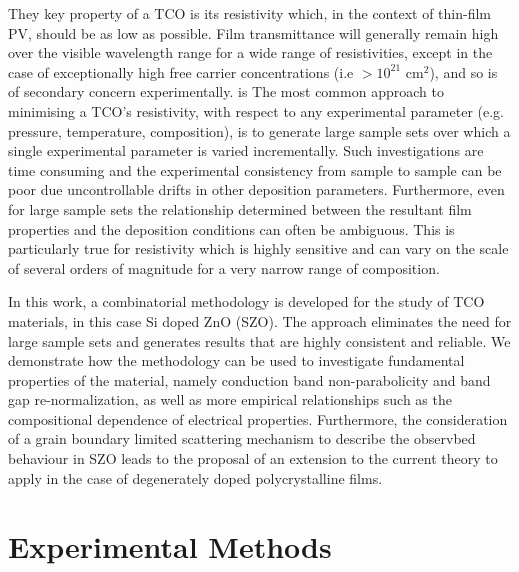 \documentclass[preprint]{elsarticle}
\begin{document}
They key property of a TCO is its resistivity which, in the context of thin-film PV, should be as low as possible. Film transmittance will generally remain high over the visible wavelength range for a wide range of resistivities, except in the case of exceptionally high free carrier concentrations (i.e $>10^{21}$ cm$^2$), and so is of secondary concern experimentally. is The most common approach to minimising a TCO's resistivity, with respect to any experimental parameter (e.g. pressure, temperature, composition), is to generate large sample sets over which a single experimental parameter is varied incrementally. Such investigations are time consuming and the experimental consistency from sample to sample can be poor due uncontrollable drifts in other deposition parameters. Furthermore, even for large sample sets the relationship determined between the resultant film properties and the deposition conditions can often be ambiguous. This is particularly true for resistivity which is highly sensitive and can vary on the scale of several orders of magnitude for a very narrow range of composition.

In this work, a combinatorial methodology is developed for the study of TCO materials, in this case Si doped ZnO (SZO). The approach eliminates the need for large sample sets and generates results that are highly consistent and reliable. We demonstrate how the methodology can be used to investigate fundamental properties of the material, namely conduction band non-parabolicity and band gap re-normalization, as well as more empirical relationships such as the compositional dependence of electrical properties. Furthermore, the consideration of a grain boundary limited scattering mechanism to describe the observbed behaviour in SZO leads to the proposal of an extension to the current theory to apply in the case of degenerately doped polycrystalline films.


\section{Experimental Methods}
\end{document}
